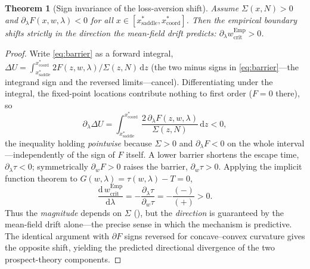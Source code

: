 \documentclass[letterpaper]{article}
\theoremstyle{plain}
\newtheorem{theorem}{Theorem}
\begin{document}
\begin{theorem}[Sign invariance of the loss-aversion shift]\label{thm:sign}
Assume $\Sigma(x,N)>0$ and $\partial_\lambda F(x,w,\lambda)<0$ for all
$x\in[x^\ast_{\mathrm{saddle}},x^\ast_{\mathrm{coord}}]$. Then the empirical
boundary shifts strictly in the direction the mean-field drift predicts:
$\partial_\lambda w_{\mathrm{crit}}^{\mathrm{Emp}}>0$.
\end{theorem}
\begin{proof}
Write \eqref{eq:barrier} as a forward integral,
$\Delta U=\int_{x^\ast_{\mathrm{saddle}}}^{x^\ast_{\mathrm{coord}}}
2F(z,w,\lambda)/\Sigma(z,N)\,\mathrm{d}z$ (the two minus signs in
\eqref{eq:barrier}---the integrand sign and the reversed limits---cancel).
Differentiating under the integral, the fixed-point locations contribute nothing
to first order ($F=0$ there), so
\begin{equation}
  \partial_\lambda \Delta U
  = \int_{x^\ast_{\mathrm{saddle}}}^{x^\ast_{\mathrm{coord}}}
      \frac{2\,\partial_\lambda F(z,w,\lambda)}{\Sigma(z,N)}\,\mathrm{d}z < 0,
  \nonumber
\end{equation}
the inequality holding \emph{pointwise} because $\Sigma>0$ and
$\partial_\lambda F<0$ on the whole interval---independently of the sign of $F$
itself. A lower barrier shortens the escape time, $\partial_\lambda\tau<0$;
symmetrically $\partial_w F>0$ raises the barrier, $\partial_w\tau>0$. Applying
the implicit function theorem to $G(w,\lambda)=\tau(w,\lambda)-T=0$,
\begin{equation}
  \frac{\mathrm{d}\,w_{\mathrm{crit}}^{\mathrm{Emp}}}{\mathrm{d}\lambda}
  = -\frac{\partial_\lambda\tau}{\partial_w\tau}
  = -\frac{(-)}{(+)} > 0 .
  \nonumber
\end{equation}
Thus the \emph{magnitude} depends on $\Sigma$ (), but the
\emph{direction} is guaranteed by the mean-field drift alone---the precise sense
in which the mechanism is predictive. The identical argument with $\partial F$
signs reversed for concave--convex curvature gives the opposite shift, yielding
the predicted directional divergence of the two prospect-theory components.
\end{proof}
\end{document}
